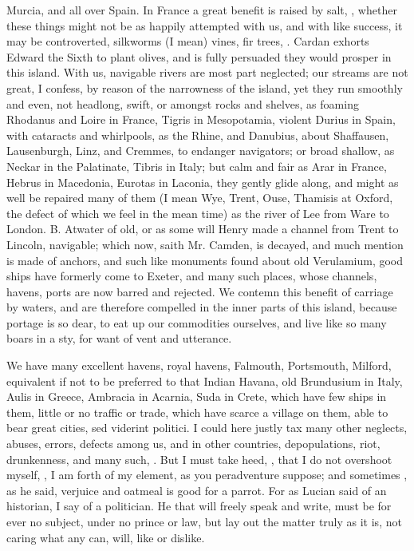 Murcia, and all over Spain. In France a great benefit is raised by
salt, \etc{}, whether these things might not be as happily attempted with
us, and with like success, it may be controverted, silkworms (I mean)
vines, fir trees, \etc{}. Cardan exhorts Edward the Sixth to plant olives,
and is fully persuaded they would prosper in this island. With us,
navigable rivers are most part neglected; our streams are not great, I
confess, by reason of the narrowness of the island, yet they run
smoothly and even, not headlong, swift, or amongst rocks and shelves,
as foaming Rhodanus and Loire in France, Tigris in Mesopotamia, violent
Durius in Spain, with cataracts and whirlpools, as the Rhine, and
Danubius, about Shaffausen, Lausenburgh, Linz, and Cremmes, to endanger
navigators; or broad shallow, as Neckar in the Palatinate, Tibris in
Italy; but calm and fair as Arar in France, Hebrus in Macedonia,
Eurotas in Laconia, they gently glide along, and might as well be
repaired many of them (I mean Wye, Trent, Ouse, Thamisis at Oxford, the
defect of which we feel in the mean time) as the river of Lee from Ware
to London. B. Atwater of old, or as some will Henry  made a
channel from Trent to Lincoln, navigable; which now, saith Mr. Camden,
is decayed, and much mention is made of anchors, and such like
monuments found about old Verulamium, good ships have formerly
come to Exeter, and many such places, whose channels, havens, ports are
now barred and rejected. We contemn this benefit of carriage by waters,
and are therefore compelled in the inner parts of this island, because
portage is so dear, to eat up our commodities ourselves, and live like
so many boars in a sty, for want of vent and utterance.

We have many excellent havens, royal havens, Falmouth, Portsmouth,
Milford, \etc{} equivalent if not to be preferred to that Indian Havana,
old Brundusium in Italy, Aulis in Greece, Ambracia in Acarnia, Suda in
Crete, which have few ships in them, little or no traffic or trade,
which have scarce a village on them, able to bear great cities, sed
viderint politici. I could here justly tax many other neglects, abuses,
errors, defects among us, and in other countries, depopulations, riot,
drunkenness, \etc{} and many such, . But I must take heed, , that I do not
overshoot myself, , I am forth of my element, as you
peradventure suppose; and sometimes , as he said,
verjuice and oatmeal is good for a parrot. For as Lucian said of an
historian, I say of a politician. He that will freely speak and write,
must be for ever no subject, under no prince or law, but lay out the
matter truly as it is, not caring what any can, will, like or dislike.

